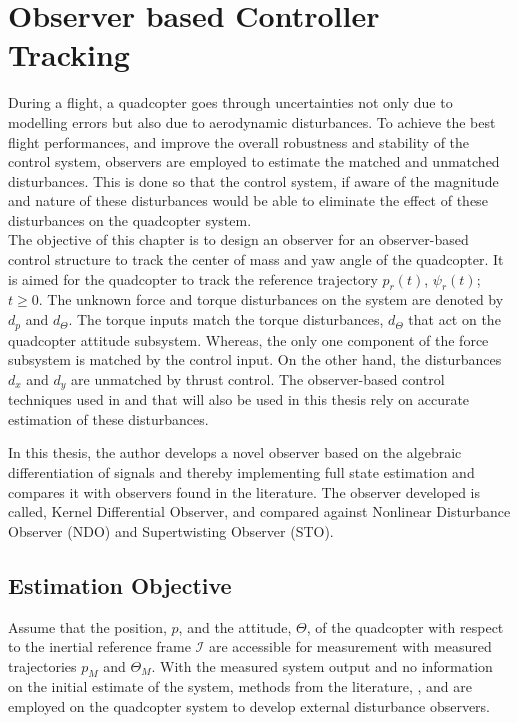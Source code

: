 \documentclass[letterpaper%
, twoside%
, 12pt%
,memoire%
, english%
,creativecommons,hyperref%
]{thETS}
\theoremstyle{newThmStyle}
\begin{document}
\chapter{Observer based Controller Tracking} \label{Chap:Observers}
During a flight, a quadcopter goes through uncertainties not only due to modelling errors but also due to aerodynamic disturbances. To achieve the best flight performances, and improve the overall robustness and stability of the control system, observers are employed to estimate the matched and unmatched disturbances. This is done so that the control system, if aware of the magnitude and nature of these disturbances would be able to eliminate the effect of these disturbances on the quadcopter system.  \\
The objective of this chapter is to design an observer for an observer-based control structure to track the center of mass and yaw angle of the quadcopter. It is aimed for the quadcopter to track the reference trajectory $p_r(t)$, $\psi_r(t)$; $t\geq 0$. The unknown force and torque disturbances on the system are denoted by $d_p$ and $d_\Theta$. The torque inputs match the torque disturbances, $d_\Theta$ that act on the quadcopter attitude subsystem. Whereas, the only one component of the force subsystem is matched by the control input. On the other hand, the disturbances $d_x$ and $d_y$ are unmatched by thrust control. The observer-based control techniques used in \citep{RN114} and \citep{RN117} that will also be used in this thesis rely on accurate estimation of these disturbances. 

In this thesis, the author develops a novel observer based on the algebraic differentiation of signals and thereby implementing full state estimation and compares it with observers found in the literature. The observer developed is called, Kernel Differential Observer, and compared against Nonlinear Disturbance Observer (NDO) and Supertwisting Observer (STO).

\section{Estimation Objective}
Assume that the position, $p$, and the attitude, $\Theta$, of the quadcopter with respect to the inertial reference frame $\mathcal{I}$ are accessible for measurement with measured trajectories $p_{M}$ and $\Theta_{M}$. With the measured system output and no information on the initial estimate of the system, methods from the literature, \citep{RN114}, \citep{RN117} and \citep{RN83} are employed on the quadcopter system to develop external disturbance observers.
\end{document}
